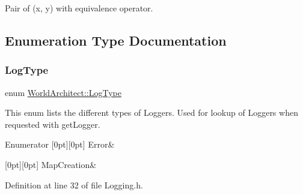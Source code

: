 Pair of (x, y) with equivalence operator. 



\subsection{Enumeration Type Documentation}
\mbox{\label{namespace_world_architect_adf13e54f2c38346ed9d5013cff07fc8e}} 
\subsubsection{\texorpdfstring{LogType}{LogType}}
{\footnotesize\ttfamily enum \mbox{\hyperlink{namespace_world_architect_adf13e54f2c38346ed9d5013cff07fc8e}{World\+Architect\+::\+Log\+Type}}}



This enum lists the different types of Loggers. Used for lookup of Loggers when requested with get\+Logger. 

\begin{DoxyEnumFields}{Enumerator}
[0pt][0pt]{}\mbox{\label{namespace_world_architect_adf13e54f2c38346ed9d5013cff07fc8ea44dfaf0aee28e2619e6bff75a7d60ba2}} 
Error&\\
\hline

[0pt][0pt]{}\mbox{\label{namespace_world_architect_adf13e54f2c38346ed9d5013cff07fc8ea7af42ff20928d5e5e2650a97d7e277d0}} 
Map\+Creation&\\
\hline

\end{DoxyEnumFields}


Definition at line 32 of file Logging.\+h.

\mbox{\label{namespace_world_architect_a9bb4333e2d555bf42bf7d14ec2a2ae7b}} 
